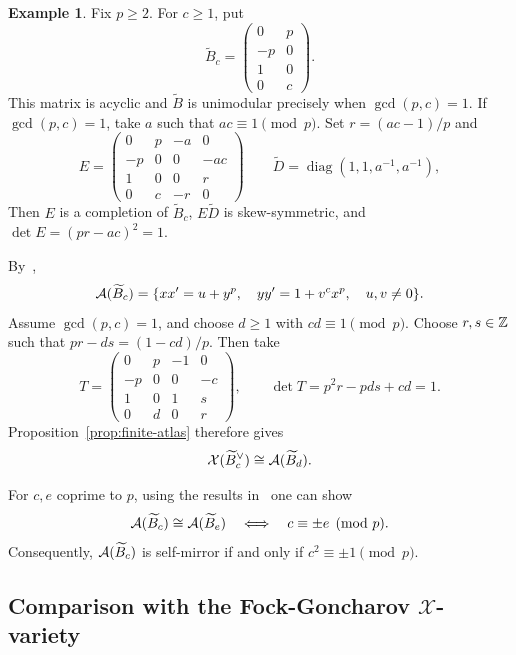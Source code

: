 \documentclass[12pt, letter]{amsart}
\theoremstyle{definition}
\newtheorem{example}[dummy]{Example}
\begin{document}
\begin{example}\label{ex:rfr-not-self-mirror}
Fix $p\ge2$. For $c\ge1$, put
\[
\widetilde B_c=\begin{pmatrix}0&p\\-p&0\\1&0\\0&c\end{pmatrix}.
\]
This matrix is acyclic and \(\widetilde B\) is unimodular precisely when $\gcd(p,c)=1$. If $\gcd(p,c)=1$, 
take \(a\) such that \(ac\equiv 1 \pmod p\). Set \(r=(ac-1)/p\) and
\[
E=
\begin{pmatrix}
0&p&-a&0\\
-p&0&0&-ac\\
1&0&0&r\\
0&c&-r&0
\end{pmatrix}
\qquad
\widetilde D=\operatorname{diag}(1,1,a^{-1},a^{-1}),
\]
Then \(E\) is a completion of \(\widetilde B_c\), \(E \widetilde D\) is skew-symmetric, and \(\det E=(pr-ac)^2=1\). 

By~\cite[Corollary~1.21]{BFZ-III},
\[
\mathcal{A}(\widetilde B_c)=\{xx'=u+y^p,\quad yy'=1+v^cx^p,\quad u,v\ne0\}.
\]
Assume $\gcd(p,c)=1$, and choose $d\ge1$ with $cd\equiv1\pmod p$.
Choose $r,s\in\mathbb{Z}$ such that $pr-ds=(1-cd)/p$. Then take
\[
T=\begin{pmatrix}
0&p&-1&0\\
-p&0&0&-c\\
1&0&1&s\\
0&d&0&r
\end{pmatrix},\qquad \det T=p^2r-pds+cd=1.
\]
Proposition~\ref{prop:finite-atlas} therefore gives
\[
\mathcal{X}(\widetilde B_c^\vee)\cong\mathcal{A}(\widetilde B_d).
\]

For $c,e$ coprime to $p$, using the results in~\cite{BlancDolgachev} one can show
\[
\mathcal{A}(\widetilde B_c)\cong\mathcal{A}(\widetilde B_e)\quad\Longleftrightarrow\quad c\equiv\pm e\pmod p.
\]
Consequently, $\mathcal{A}(\widetilde B_c)$ is self-mirror if and only if $c^2\equiv\pm1\pmod p$.









\end{example}








\subsection{Comparison with the Fock-Goncharov $\mathcal X$-variety}
\end{document}
